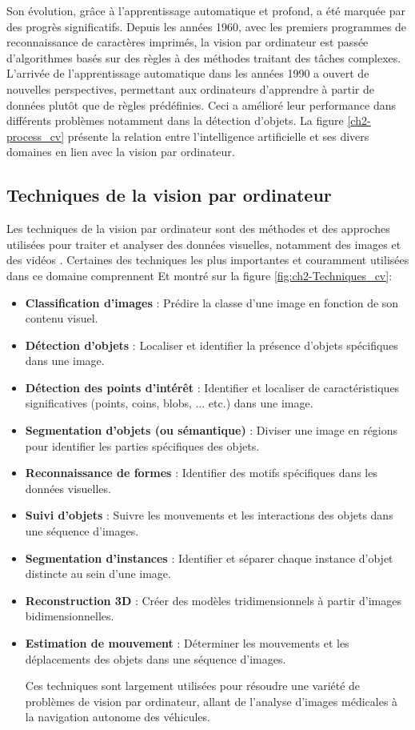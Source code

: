 Son évolution, grâce à l'apprentissage automatique et profond, a été marquée par des progrès significatifs. Depuis les années 1960, avec les premiers programmes de reconnaissance de caractères imprimés, la vision par ordinateur est passée d'algorithmes basés sur des règles à des méthodes traitant des tâches complexes. L'arrivée de l'apprentissage automatique dans les années 1990 a ouvert de nouvelles perspectives, permettant aux ordinateurs d'apprendre à partir de données plutôt que de règles prédéfinies. Ceci a amélioré leur performance dans différents problèmes notamment dans la détection d'objets. La figure \ref{ch2-process_cv} présente la relation entre l'intelligence artificielle et ses divers domaines en lien avec la vision par ordinateur.

\subsection{Techniques de la vision par ordinateur}
Les techniques de la vision par ordinateur sont des méthodes et des approches utilisées pour traiter et analyser des données visuelles, notamment des images et des vidéos \cite{javatpoint2023computer}. Certaines des techniques les plus importantes et couramment utilisées dans ce domaine comprennent Et montré sur la figure \ref{fig:ch2-Techniques_cv}:

\begin{itemize}
    \item  \textbf{Classification d'images} : Prédire la classe d'une image en fonction de son contenu visuel.
    \item  \textbf{Détection d'objets} : Localiser et identifier la présence d'objets spécifiques dans une image.
    \item  \textbf{Détection des points d'intérêt} : Identifier et localiser de caractéristiques significatives (points, coins, blobs, ... etc.) dans une image.
    \item  \textbf{Segmentation d'objets (ou sémantique)} : Diviser une image en régions pour identifier les parties spécifiques des objets.
    \item  \textbf{Reconnaissance de formes} : Identifier des motifs spécifiques dans les données visuelles.
    \item  \textbf{Suivi d'objets} : Suivre les mouvements et les interactions des objets dans une séquence d'images.
    \item  \textbf{Segmentation d'instances} : Identifier et séparer chaque instance d'objet distincte au sein d'une image.
    \item  \textbf{Reconstruction 3D} : Créer des modèles tridimensionnels à partir d'images bidimensionnelles.
    \item  \textbf{Estimation de mouvement} : Déterminer les mouvements et les déplacements des objets dans une séquence d'images.

Ces techniques sont largement utilisées pour résoudre une variété de problèmes de vision par ordinateur, allant de l'analyse d'images médicales à la navigation autonome des véhicules.
\end{itemize}

